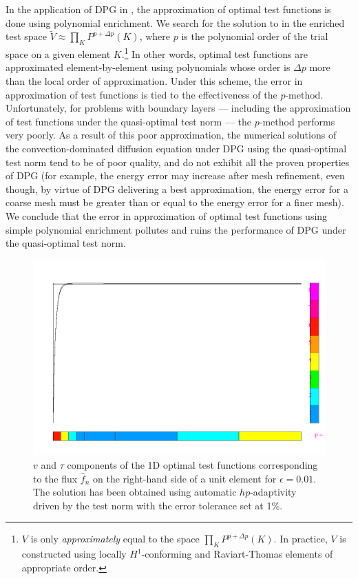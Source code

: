 In the application of DPG in \cite{DPG1,DPG2,DPG3,DPG4}, the approximation of optimal test functions is done using polynomial enrichment. We search for the solution to  in the enriched test space $\tilde{V} \approx \prod_{K} P^{p+\Delta p}(K)$, where $p$ is the polynomial order of the trial space on a given element $K$.\footnote{$V$ is only \emph{approximately} equal to the space $\prod_{K} P^{p+\Delta p}(K)$. In practice, $V$ is constructed using locally $H^1$-conforming and Raviart-Thomas elements of appropriate order.}  In other words, optimal test functions are approximated element-by-element using polynomials whose order is $\Delta p$ more than the local order of approximation.  Under this scheme, the error in approximation of test functions is tied to the effectiveness of the $p$-method.  Unfortunately, for problems with boundary layers --- including the approximation of test functions under the quasi-optimal test norm --- the $p$-method performs very poorly. As a result of this poor approximation, the numerical solutions of the convection-dominated diffusion equation under DPG using the quasi-optimal test norm tend to be of poor quality, and do not exhibit all the proven properties of DPG (for example, the energy error may increase after mesh refinement, even though, by virtue of DPG delivering a best approximation, the energy error for a coarse mesh must be greater than or equal to the energy error for a finer mesh).  We conclude that the error in approximation of optimal test functions using simple polynomial enrichment pollutes and ruins the performance of DPG under the quasi-optimal test norm. 

\begin{figure}[!h]
\centering
\includegraphics[scale=.25]{figs/opt.png}
\caption{$v$ and $\tau$ components of the 1D optimal test functions corresponding to the flux $\widehat{f}_n$ on the right-hand side of a unit element for $\epsilon = 0.01$. The solution has been obtained using automatic $hp$-adaptivity driven by the test norm with the error tolerance set at 1\%.}
\label{fig:optTestBoundary}
\end{figure}

